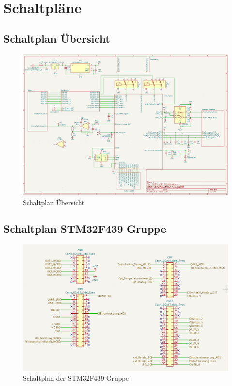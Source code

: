 \appendix
\section{Schaltpläne}
\label{sec:Schaltplan}
\subsection{Schaltplan Übersicht}
\begin{figure}[H]
	\centering
	\includegraphics[width=1.0\textwidth]{images/Hardware/Schaltplan_Gesamt.PNG}
	\caption{Schaltplan Übersicht}
	\label{fig:Schaltplanuebersicht}
\end{figure}
\subsection{Schaltplan STM32F439 Gruppe}
\begin{figure}[H]
	\centering
	\includegraphics[width=1.0\textwidth]{images/Hardware/Schaltplan_STM32.PNG}
	\caption{Schaltplan der STM32F439 Gruppe}
	\label{fig:STM32Gruppe}
\end{figure}
